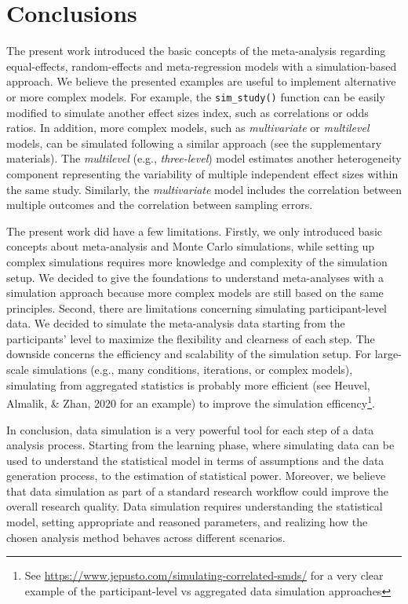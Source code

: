 \documentclass[
  man,floatsintext]{apa6}
\begin{document}
\normalsize

\hypertarget{conclusions}{%
\section{Conclusions}\label{conclusions}}

The present work introduced the basic concepts of the meta-analysis regarding equal-effects, random-effects and meta-regression models with a simulation-based approach. We believe the presented examples are useful to implement alternative or more complex models. For example, the \texttt{sim\_study()} function can be easily modified to simulate another effect sizes index, such as correlations or odds ratios. In addition, more complex models, such as \emph{multivariate} or \emph{multilevel} models, can be simulated following a similar approach (see the supplementary materials). The \emph{multilevel} (e.g., \emph{three-level}) model estimates another heterogeneity component representing the variability of multiple independent effect sizes within the same study. Similarly, the \emph{multivariate} model includes the correlation between multiple outcomes and the correlation between sampling errors.

The present work did have a few limitations. Firstly, we only introduced basic concepts about meta-analysis and Monte Carlo simulations, while setting up complex simulations requires more knowledge and complexity of the simulation setup. We decided to give the foundations to understand meta-analyses with a simulation approach because more complex models are still based on the same principles. Second, there are limitations concerning simulating participant-level data. We decided to simulate the meta-analysis data starting from the participants' level to maximize the flexibility and clearness of each step. The downside concerns the efficiency and scalability of the simulation setup. For large-scale simulations (e.g., many conditions, iterations, or complex models), simulating from aggregated statistics is probably more efficient (see Heuvel, Almalik, \& Zhan, 2020 for an example) to improve the simulation efficency\footnote{See \url{https://www.jepusto.com/simulating-correlated-smds/} for a very clear example of the participant-level vs aggregated data simulation approaches}.

In conclusion, data simulation is a very powerful tool for each step of a data analysis process. Starting from the learning phase, where simulating data can be used to understand the statistical model in terms of assumptions and the data generation process, to the estimation of statistical power. Moreover, we believe that data simulation as part of a standard research workflow could improve the overall research quality. Data simulation requires understanding the statistical model, setting appropriate and reasoned parameters, and realizing how the chosen analysis method behaves across different scenarios.
\end{document}
